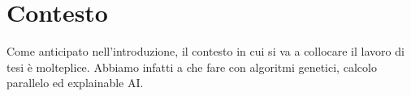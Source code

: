 \chapter{Contesto}

Come anticipato nell'introduzione, il contesto in cui si va a collocare il
lavoro di tesi è molteplice. Abbiamo infatti a che fare con algoritmi genetici,
calcolo parallelo ed explainable AI.
